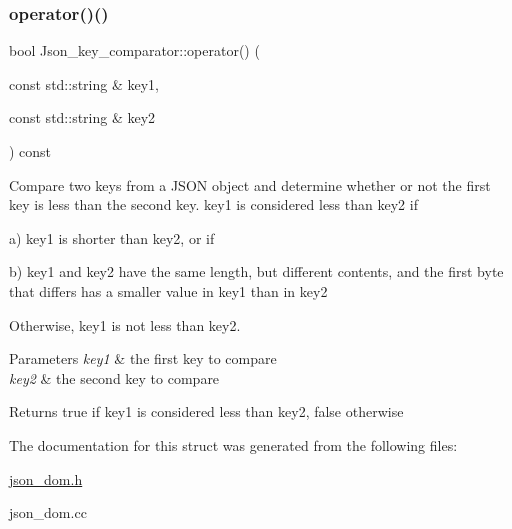 \subsubsection{\texorpdfstring{operator()()}{operator()()}}
{\footnotesize\ttfamily bool Json\+\_\+key\+\_\+comparator\+::operator() (\begin{DoxyParamCaption}\item[{const std\+::string \&}]{key1,  }\item[{const std\+::string \&}]{key2 }\end{DoxyParamCaption}) const}

Compare two keys from a J\+S\+ON object and determine whether or not the first key is less than the second key. key1 is considered less than key2 if

a) key1 is shorter than key2, or if

b) key1 and key2 have the same length, but different contents, and the first byte that differs has a smaller value in key1 than in key2

Otherwise, key1 is not less than key2.


\begin{DoxyParams}{Parameters}
{\em key1} & the first key to compare \\
\hline
{\em key2} & the second key to compare \\
\hline
\end{DoxyParams}
\begin{DoxyReturn}{Returns}
true if key1 is considered less than key2, false otherwise 
\end{DoxyReturn}


The documentation for this struct was generated from the following files\+:\begin{DoxyCompactItemize}
\item 
\mbox{\hyperlink{json__dom_8h}{json\+\_\+dom.\+h}}\item 
json\+\_\+dom.\+cc\end{DoxyCompactItemize}
